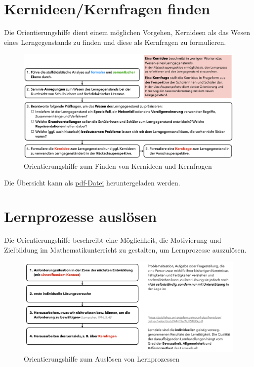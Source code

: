 \documentclass[
]{scrbook}
\theoremstyle{definition}
\theoremstyle{definition}
\theoremstyle{definition}
\theoremstyle{definition}
\theoremstyle{remark}
\begin{document}
\section{Kernideen/Kernfragen finden}\label{orientierungshilfe-kernideen-finden}

Die Orientierungshilfe dient einem möglichen Vorgehen, Kernideen als das Wesen eines Lerngegenstands zu finden und diese als Kernfragen zu formulieren.

\begin{figure}

{\centering \includegraphics[width=0.9\linewidth]{pictures/C-OrientierungshilfeKernidee} 

}

\caption{Orientierungshilfe zum Finden von Kernideen und Kernfragen}\label{fig:OrientierungKernidee}
\end{figure}

Die Übersicht kann als \href{files/Stoffdidaktik2024-OrientierungshilfeKernidee.pdf}{pdf-Datei} heruntergeladen werden.

\section{Lernprozesse auslösen}\label{orientierungshilfe-lernprozesse-ausloesen}

Die Orientierungshilfe beschreibt eine Möglichkeit, die Motivierung und Zielbildung im Mathematikunterricht zu gestalten, um Lernprozesse auszulösen.

\begin{figure}

{\centering \includegraphics[width=0.9\linewidth]{pictures/C-OrientierungshilfeLernprozesseAusloesen} 

}

\caption{Orientierungshilfe zum Auslösen von Lernprozessen}\label{fig:OrientierungAusloesen}
\end{figure}
\end{document}
